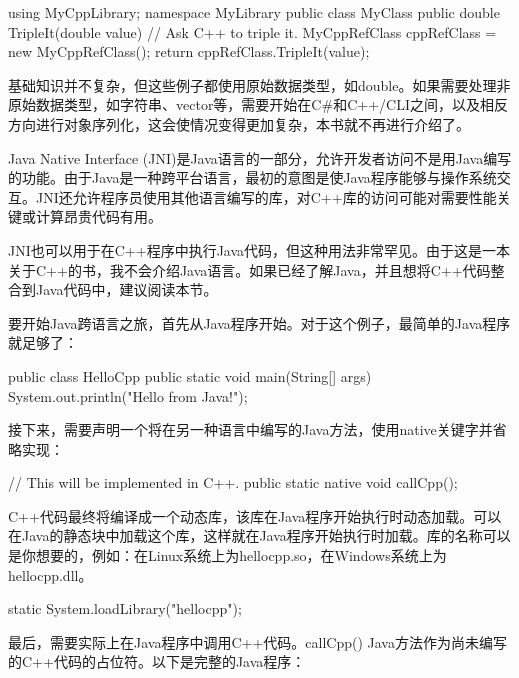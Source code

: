 \begin{cpp}
using MyCppLibrary;
namespace MyLibrary
{
    public class MyClass
    {
        public double TripleIt(double value)
        {
            // Ask C++ to triple it.
            MyCppRefClass cppRefClass = new MyCppRefClass();
            return cppRefClass.TripleIt(value);
        }
    }
}
\end{cpp}

基础知识并不复杂，但这些例子都使用原始数据类型，如double。如果需要处理非原始数据类型，如字符串、vector等，需要开始在C\#和C++/CLI之间，以及相反方向进行对象序列化，这会使情况变得更加复杂，本书就不再进行介绍了。


Java Native Interface (JNI)是Java语言的一部分，允许开发者访问不是用Java编写的功能。由于Java是一种跨平台语言，最初的意图是使Java程序能够与操作系统交互。JNI还允许程序员使用其他语言编写的库，对C++库的访问可能对需要性能关键或计算昂贵代码有用。

JNI也可以用于在C++程序中执行Java代码，但这种用法非常罕见。由于这是一本关于C++的书，我不会介绍Java语言。如果已经了解Java，并且想将C++代码整合到Java代码中，建议阅读本节。

要开始Java跨语言之旅，首先从Java程序开始。对于这个例子，最简单的Java程序就足够了：

\begin{cpp}
public class HelloCpp
{
    public static void main(String[] args)
    {
        System.out.println("Hello from Java!");
    }
}
\end{cpp}

接下来，需要声明一个将在另一种语言中编写的Java方法，使用native关键字并省略实现：

\begin{cpp}
// This will be implemented in C++.
public static native void callCpp();
\end{cpp}

C++代码最终将编译成一个动态库，该库在Java程序开始执行时动态加载。可以在Java的静态块中加载这个库，这样就在Java程序开始执行时加载。库的名称可以是你想要的，例如：在Linux系统上为hellocpp.so，在Windows系统上为hellocpp.dll。

\begin{cpp}
static { System.loadLibrary("hellocpp"); }
\end{cpp}

最后，需要实际上在Java程序中调用C++代码。callCpp() Java方法作为尚未编写的C++代码的占位符。以下是完整的Java程序：

